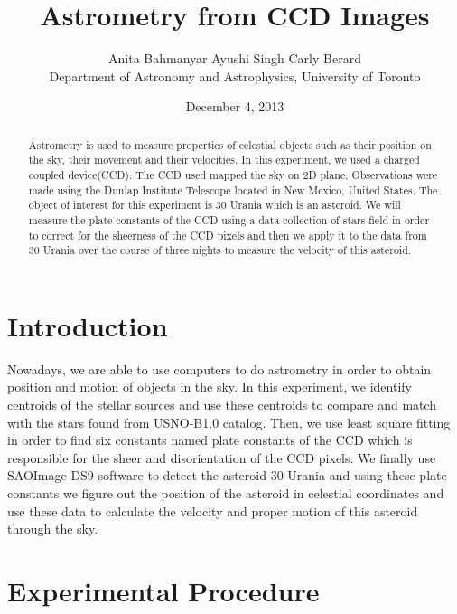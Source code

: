 \documentclass[letterpaper,12pt]{article}
\title{Astrometry from CCD Images }
\author{Anita Bahmanyar \qquad Ayushi Singh \qquad Carly Berard \\Department of Astronomy and Astrophysics, University of Toronto}
\affil{\small {anita.bahmanyar@mail.utoronto.ca}}
\date{December 4, 2013}
\begin{document}
\maketitle

\begin{abstract}
\label{abstract}
Astrometry is used to measure properties of celestial objects such as their position on the sky, their movement and their velocities. In this experiment, we used a charged coupled device(CCD). The CCD used mapped the sky on 2D plane. Observations were made using the Dunlap Institute Telescope located in New Mexico, United States. The object of interest for this experiment is 30 Urania which is an asteroid. We will measure the plate constants of the CCD using a data collection of stars field in order to correct for the sheerness of the CCD pixels and then we apply it to the data from 30 Urania over the course of three nights to measure the velocity of this asteroid.

\end{abstract}

\section{Introduction}
\label{sec:introduction}
Nowadays, we are able to use computers to do astrometry in order to obtain position and motion of objects in the sky. In this experiment, we identify centroids of the stellar sources and use these centroids to compare  and match with the stars found from USNO-B1.0 catalog. Then, we use least square fitting in order to find six constants named plate constants of the CCD which is responsible for the sheer and disorientation of the CCD pixels. We finally use SAOImage DS9 software to detect the asteroid 30 Urania and using these plate constants we figure out the position of the asteroid in celestial coordinates and use these data to calculate the velocity and proper motion of this asteroid through the sky.


\section{Experimental Procedure}
\label{sec:experimental procedure}
\end{document}
